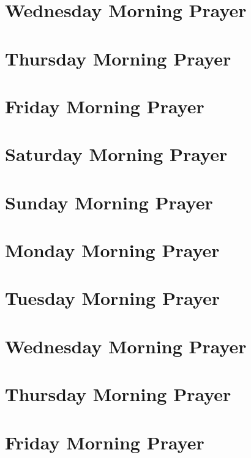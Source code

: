 \documentclass[12pt,twocolumn]{book}
\begin{document}
\section{Wednesday Morning Prayer}


\section{Thursday Morning Prayer}


\section{Friday Morning Prayer}


\section{Saturday Morning Prayer}



\section{Sunday Morning Prayer}


\section{Monday Morning Prayer}


\section{Tuesday Morning Prayer}


\section{Wednesday Morning Prayer}


\section{Thursday Morning Prayer}


\section{Friday Morning Prayer}

\end{document}
